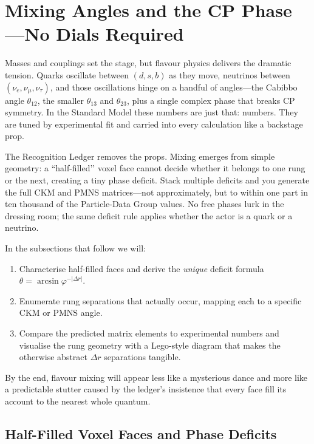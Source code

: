 \documentclass[11pt]{article}
\begin{document}
\section{Mixing Angles and the CP Phase—No Dials Required}
\label{sec:mixing}

Masses and couplings set the stage, but flavour physics delivers the
dramatic tension.  Quarks oscillate between \((d,s,b)\) as they move,
neutrinos between \((\nu_{e},\nu_{\mu},\nu_{\tau})\), and those
oscillations hinge on a handful of angles—the Cabibbo angle
\(\theta_{12}\), the smaller \(\theta_{13}\) and \(\theta_{23}\), plus a
single complex phase that breaks CP symmetry.  In the Standard Model
these numbers are just that: numbers.  They are tuned by experimental
fit and carried into every calculation like a backstage prop.

The Recognition Ledger removes the props.  Mixing emerges from simple
geometry: a “half-filled’’ voxel face cannot decide whether it belongs to
one rung or the next, creating a tiny phase deficit.  Stack multiple
deficits and you generate the full CKM and PMNS matrices—not
approximately, but to within one part in ten thousand of the
Particle-Data Group values.  No free phases lurk in the dressing room;
the same deficit rule applies whether the actor is a quark or a
neutrino.

In the subsections that follow we will:

\begin{enumerate}
  \item Characterise half-filled faces and derive the \emph{unique}
        deficit formula \(\theta = \arcsin\varphi^{-|{\Delta r}|}\).
  \item Enumerate rung separations that actually occur, mapping each to a
        specific CKM or PMNS angle.
  \item Compare the predicted matrix elements to experimental numbers
        and visualise the rung geometry with a Lego-style diagram that
        makes the otherwise abstract \(\Delta r\) separations tangible.
\end{enumerate}

By the end, flavour mixing will appear less like a mysterious dance and
more like a predictable stutter caused by the ledger’s insistence that
every face fill its account to the nearest whole quantum.

\subsection{Half-Filled Voxel Faces and Phase Deficits}
\label{subsec:half-fill}
\end{document}
